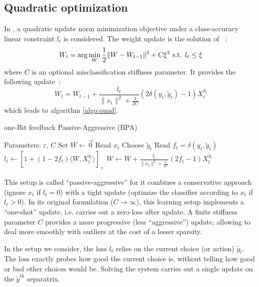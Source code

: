 \documentclass[preprint,12pt,authoryear]{elsarticle}
\begin{document}
\subsection{Quadratic optimization}
 
In \cite{crammer2006online}, a quadratic update norm minimization objective under a class-accuracy linear constraint $ l_t $ is considered.  
The weight update is the solution of ~:
$$W_{t} = \arg \min_W \frac{1}{2} \| W - W_{t-1}\|^2 + C \xi^2 \hbox{ s.t. } l_t \leq \xi$$
where $C$ is an optional misclassification stiffness parameter. It provides the following update~:
$$W_{t} =  W_{t-1} + \frac{l_t}{\|x_t\|^2 + \frac{1}{2C}} (2\delta(y_t,\tilde{y}_t) - 1) X_t^{\tilde{y}_t}$$
which leads to algorithm \ref{algo:quad}.

\begin{algorithm}[t!]
	\caption{one-Bit feedback Passive-Aggressive (BPA)}\label{algo:quad}
	\begin{algorithmic}
		\STATE Parameters:  $\varepsilon$, $C$
		\STATE Set $W \leftarrow \vec{0}$
		\STATE Read $x_t$
		\STATE Choose $\tilde{y}_t$
		\STATE Read $f_t = \delta(y_t,\tilde{y}_t)$
		\STATE $l_t \leftarrow \left[ 1+(1-2f_t)\langle W,X_t^{\tilde{y}_t}\rangle\right]_{+}$ 
		\STATE $W \leftarrow W + \frac{l_t}{\parallel x_t\parallel^2 + \frac{1}{2C}} (2f_t-1) X_t^{\tilde{y}_t}$
		\ENDFOR
	\end{algorithmic}
\end{algorithm}

This setup is called ``passive-aggressive'' for it combines a conservative approach (ignore $x_t$ if $l_t=0$) with a tight update (optimize the classifier according to $x_t$ if $l_t>0$).
In its original formulation ($C \rightarrow \infty$), this learning setup implements a ``one-shot'' update, i.e. carries out a zero-loss  after update. A finite stiffness parameter $C$ provides a more progressive (less ``aggressive'') update, allowing to deal more smoothly with outliers at the cost of a lesser sparsity.

In the setup we consider, the loss $l_t$ relies on the current choice (or action) $\tilde{y}_t$. The loss exactly probes how good the current choice is, without telling how good or bad other choices would be. Solving the system carries out a single update on the  $\tilde{y}^\text{th}$ separatrix. 
\end{document}
